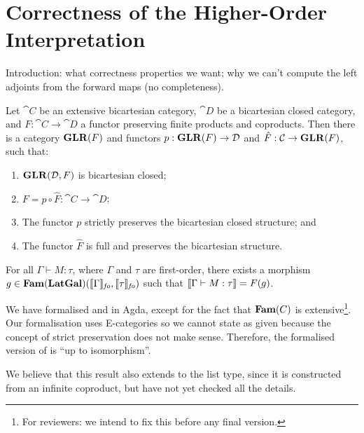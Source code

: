 \section{Correctness of the Higher-Order Interpretation}
\label{sec:definability}

Introduction: what correctness properties we want; why we can't
compute the left adjoints from the forward maps (no completeness).

\begin{theorem}
  \label{thm:glr-definability}
  Let $\cat{C}$ be an extensive bicartesian category, $\cat{D}$ be a
  bicartesian closed category, and $F : \cat{C} \to \cat{D}$ a functor
  preserving finite products and coproducts. Then there is a category
  $\mathbf{GLR}(F)$ and functors $p : \mathbf{GLR}(F) \to \mathcal{D}$ and
  $\hat{F} : \mathcal{C} \to \mathbf{GLR}(F)$, such that:
  \begin{enumerate}
  \item $\mathbf{GLR}(\mathcal{D},F)$ is bicartesian closed;
  \item $F = p \circ \hat{F} : \cat{C} \to \cat{D}$;
  \item The functor $p$ strictly preserves the bicartesian closed structure; and
  \item The functor $\hat{F}$ is full and preserves the bicartesian structure.
  \end{enumerate}
\end{theorem}

\begin{theorem}
  \label{thm:language-definability}
  For all $\Gamma \vdash M : \tau$, where $\Gamma$ and $\tau$ are
  first-order, there exists a morphism
  $g \in \mathbf{Fam}(\mathbf{LatGal})(\llbracket \Gamma \rrbracket_{\mathit{fo}},
  \llbracket \tau \rrbracket_{\mathit{fo}})$ such that
  $\llbracket \Gamma \vdash M : \tau \rrbracket = F(g)$.
\end{theorem}


\begin{remark}
  We have formalised  and
   in Agda, except for the fact that
  $\mathbf{Fam}(C)$ is extensive\footnote{For reviewers: we intend to fix this
    before any final version.}. Our formalisation uses E-categories
  \cite{palmgren-wilander} so we cannot state
   as given because the concept of strict
  preservation does not make sense. Therefore, the formalised version
  of  is ``up to isomorphism''.

  We believe that this result also extends to the list type, since it
  is constructed from an infinite coproduct, but have not yet checked
  all the details.
\end{remark}

